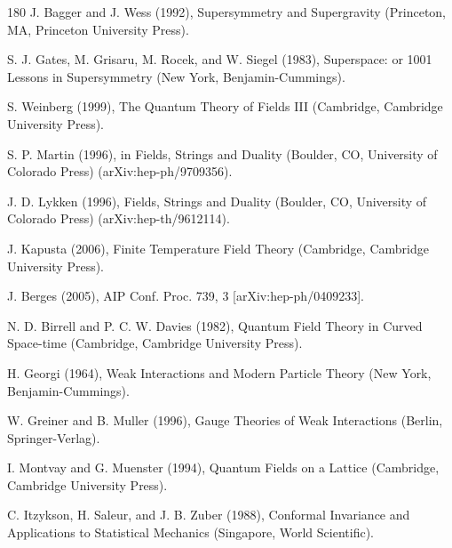 \begin{thebibliography}{180}
 J. Bagger and J. Wess (1992), Supersymmetry and Supergravity (Princeton, MA, Princeton University Press).

 S. J. Gates, M. Grisaru, M. Rocek, and W. Siegel (1983), Superspace: or 1001 Lessons in Supersymmetry (New York, Benjamin-Cummings).

 S. Weinberg (1999), The Quantum Theory of Fields III (Cambridge, Cambridge University Press).

 S. P. Martin (1996), in Fields, Strings and Duality (Boulder, CO, University of Colorado Press) (arXiv:hep-ph/9709356).

 J. D. Lykken (1996), Fields, Strings and Duality (Boulder, CO, University of Colorado Press) (arXiv:hep-th/9612114).

 J. Kapusta (2006), Finite Temperature Field Theory (Cambridge, Cambridge University Press).

 J. Berges (2005), AIP Conf. Proc. 739, 3 [arXiv:hep-ph/0409233].

 N. D. Birrell and P. C. W. Davies (1982), Quantum Field Theory in Curved Space-time (Cambridge, Cambridge University Press).

 H. Georgi (1964), Weak Interactions and Modern Particle Theory (New York, Benjamin-Cummings).

 W. Greiner and B. Muller (1996), Gauge Theories of Weak Interactions (Berlin, Springer-Verlag).

 I. Montvay and G. Muenster (1994), Quantum Fields on a Lattice (Cambridge, Cambridge University Press).

 C. Itzykson, H. Saleur, and J. B. Zuber (1988), Conformal Invariance and Applications to Statistical Mechanics (Singapore, World Scientific).


\end{thebibliography}
